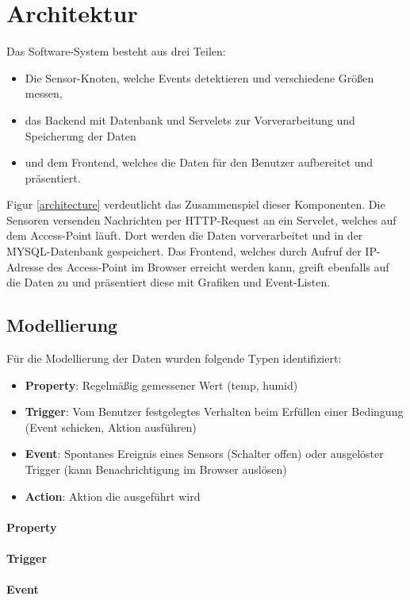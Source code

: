 \documentclass[12pt,a4paper,twoside]{article}
\newcommand{\labelSec}[1]{\label{sec:#1}}
\begin{document}
\section{Architektur}\labelSec{abschnitt}
Das Software-System besteht aus drei Teilen: 
\begin{itemize}
\item Die Sensor-Knoten, welche Events detektieren und verschiedene Größen messen,
\item das Backend mit Datenbank und Servelets zur Vorverarbeitung und Speicherung der Daten
\item und dem Frontend, welches die Daten für den Benutzer aufbereitet und präsentiert.
\end{itemize}
Figur \ref{architecture} verdeutlicht das Zusammenspiel dieser Komponenten. Die Sensoren versenden Nachrichten per HTTP-Request an ein Servelet, welches auf dem Access-Point läuft. Dort werden die Daten vorverarbeitet und in der MYSQL-Datenbank gespeichert. Das Frontend, welches durch Aufruf der IP-Adresse des Access-Point im Browser erreicht werden kann, greift ebenfalls auf die Daten zu und präsentiert diese mit Grafiken und Event-Listen. 

\subsection{Modellierung}
Für die Modellierung der Daten wurden folgende Typen identifiziert: 
\begin{itemize}
\item 
\textbf{Property}: Regelmäßig gemessener Wert (temp, humid)
\item 
\textbf{Trigger}: Vom Benutzer festgelegtes Verhalten beim
Erfüllen einer Bedingung (Event schicken, Aktion
ausführen)
\item 
\textbf{Event}: Spontanes Ereignis eines Sensors (Schalter
offen) oder ausgelöster Trigger (kann
Benachrichtigung im Browser auslösen)
\item 
\textbf{Action}: Aktion die ausgeführt wird
\end{itemize}
\paragraph{Property}
\paragraph{Trigger}

\paragraph{Event}
\end{document}
